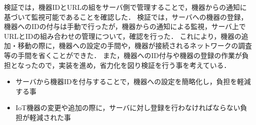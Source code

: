 検証では，機器IDとURLの組をサーバ側で管理することで，機器からの通知に基づいて監視可能であることを確認した．
検証では，サーバへの機器の登録，機器へのIDの付与は手動で行ったが，機器からの通知による監視，サーバ上でURLとIDの組み合わせの管理について，確認を行った．
これにより，機器の追加・移動の際に，機器への設定の手間や，機器が接続されるネットワークの調査等の手間を省くことができた．
また，機器へのID付与や機器の登録の作業が負担となったので，実装を進め，省力化を図り検証を行う事を考えている．

\begin{itemize}
\item サーバから機器IDを付与することで，機器への設定を簡略化し，負担を軽減する事
\item IoT機器の変更や追加の際に，サーバに対し登録を行わなければならない負担が軽減された事
\end{itemize}

